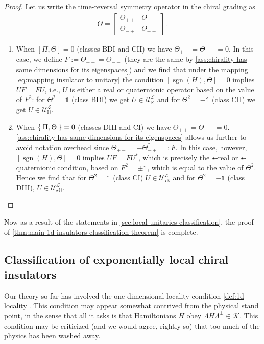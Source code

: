 \documentclass[a4paper,10pt]{article}
\numberwithin{equation}{section}
\theoremstyle{plain}
\theoremstyle{plain}
\theoremstyle{plain}
\theoremstyle{plain}
\theoremstyle{plain}
\theoremstyle{remark}
\theoremstyle{definition}
\theoremstyle{plain}
\newcommand{\RR}{\mathbb{R}}
\newcommand{\calU}{\mathcal{U}}
\newcommand{\calK}{\mathcal{K}}
\newcommand{\calL}{\mathcal{L}}
\newcommand{\Id}{\mathds{1}}
\newcommand{\HH}{\mathbb{H}}
\newcommand{\sgn}{\operatorname{sgn}}
\newcommand{\eq}[1]{\begin{align*}#1\end{align*}}
\begin{document}
\begin{proof}
		Let us write the time-reversal symmetry operator in the chiral grading as \eq{\Theta=\begin{bmatrix}\Theta_{++} & \Theta_{+-} \\ \Theta_{-+} & \Theta_{--}\end{bmatrix}\,.} 
		\begin{enumerate}
			\item When $[\Pi,\Theta]=0$ (classes BDI and CII) we have $\Theta_{+-}=\Theta_{-+}=0$. In this case, we define $F:=\Theta_{++}=\Theta_{--}$ (they are the same by \cref{ass:chirality has same dimensions for its eigenspaces}) and we find that under the mapping \cref{eq:mapping insulator to unitary} the condition $[\sgn(H),\Theta]=0$ implies $UF=FU$, i.e., $U$ is either a real or quaternionic operator based on the value of $F^2$: for $\Theta^2=\Id$ (class BDI) we get $U\in\calU^\calL_{\RR}$ and for $\Theta^2=-\Id$ (class CII) we get $U\in\calU^\calL_{\HH}$.
			\item When $\Set{\Pi,\Theta}=0$ (classes DIII and CI) we have $\Theta_{++}=\Theta_{--}=0$. \cref{ass:chirality has same dimensions for its eigenspaces} allows us further to avoid notation overhead since $\Theta_{+-}=-\Theta_{-+}^\ast=:F$. In this case, however, $[\sgn(H),\Theta]=0$ implies $UF=FU^\ast$, which is precisely the $\star$-real or $\star$-quaternionic condition, based on $F^2=\pm\Id$, which is equal to the value of $\Theta^2$. Hence we find that for $\Theta^2=\Id$ (class CI) $U\in\calU^\calL_{\star\RR}$ and for $\Theta^2=-\Id$ (class DIII), $U\in\calU^\calL_{\star\HH}$.
		\end{enumerate}
	\end{proof}
	
	Now as a result of the statements in \cref{sec:local unitaries classification}, the proof of \cref{thm:main 1d insulators classification theorem} is complete.
	
	\subsection{Classification of exponentially local chiral insulators}\label{subsec:exp locality 1d chiral classification}
	Our theory so far has involved the one-dimensional locality condition \cref{def:1d locality}. This condition may appear somewhat contrived from the physical stand point, in the sense that all it asks is that Hamiltonians $H$ obey $\Lambda H \Lambda^\perp \in \calK$. This condition may be criticized (and we would agree, rightly so) that too much of the physics has been washed away.
	
\end{document}
